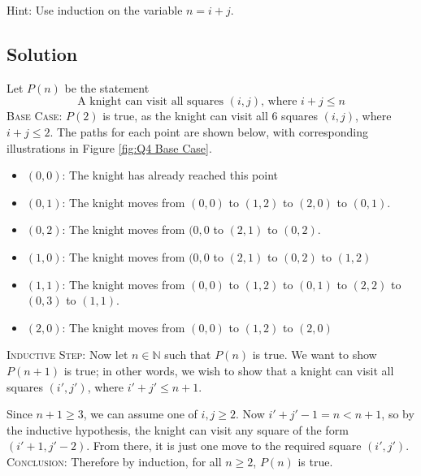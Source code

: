 \documentclass{article}
\begin{document}
    {\small \vspace{1.5mm} 
    Hint: Use induction on the variable $n = i + j$.}
    
\subsection*{Solution}
    Let $P(n)$ be the statement $$\text{A knight can visit all squares $(i, j)$, where $i + j \le n$}$$
    \textsc{Base Case}: $P(2)$ is true, as the knight can visit all $6$ squares $(i, j)$, where $i + j \le 2$. The paths for each point are shown below, with corresponding illustrations in Figure \ref{fig:Q4 Base Case}.
    
    \begin{itemize}[label = {}]
        \item $(0, 0)$: The knight has already reached this point
        \item $(0, 1)$: The knight moves from $(0, 0)$ to $(1, 2)$ to $(2, 0)$ to $(0, 1)$.
        \item $(0, 2)$: The knight moves from $(0, 0$ to $(2, 1)$ to $(0, 2)$.
        \item $(1, 0)$: The knight moves from $(0, 0$ to $(2, 1)$ to $(0, 2)$ to $(1, 2)$
        \item $(1, 1)$: The knight moves from $(0, 0)$ to $(1, 2)$ to $(0, 1)$ to $(2, 2)$ to $(0, 3)$ to $(1, 1)$.
        \item $(2, 0)$: The knight moves from $(0, 0)$ to $(1, 2)$ to $(2, 0)$
    \end{itemize}
    \textsc{Inductive Step}: Now let $n \in \mathbb{N}$ such that $P(n)$ is true. We want to show $P(n + 1)$ is true; in other words, we wish to show that a knight can visit all squares $(i', j')$, where $i' + j' \le n + 1$.
    
    \vspace{1.5mm}
    Since $n + 1 \ge 3$, we can assume one of $i, j \ge 2$. Now $i' + j' -1 = n < n + 1$, so by the inductive hypothesis, the knight can visit any square of the form $(i' + 1, j' - 2)$. From there, it is just one move to the required square $(i', j')$. \\
    \textsc{Conclusion}: Therefore by induction, for all $n \ge 2$, $P(n)$ is true.
    
\end{document}
